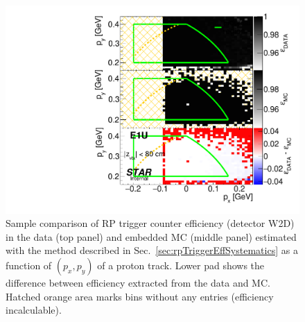 \begin{figure}[h]%
	\centering
	\parbox{0.4725\textwidth}{
		\centering
		\includegraphics[width=\linewidth,page=8]{graphics/systematicsEfficiency/RpSyst/relativeTriggerEff2D_pxpy.pdf}%
	}
	\quad
	\parbox{0.4725\textwidth}{
		\centering\vspace*{-100pt}
		\caption[Coparison of estimated RP trigger counter efficiency in 2D (detector W2D).]%
    {Sample comparison of RP trigger counter efficiency (detector W2D) in the data (top panel) and embedded MC (middle panel) estimated with the method described in Sec.~\ref{sec:rpTriggerEffSystematics} as a function of $(p_{x},p_{y})$ of a proton track. Lower pad shows the difference between efficiency extracted from the data and MC. Hatched orange area marks bins without any entries (efficiency incalculable).%
    }
	}
	\label{fig:relativeRpRecoEff_W2D}
\end{figure}

